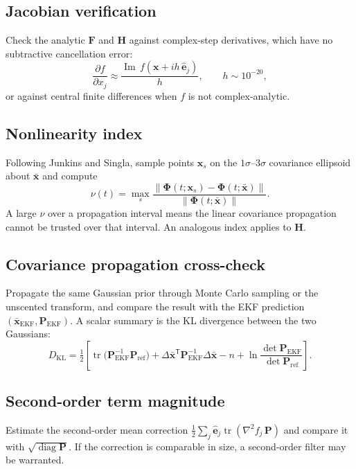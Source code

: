 \documentclass[11pt]{article}
\newcommand{\x}{\bm{x}}
\newcommand{\Pm}{\bm{P}}
\newcommand{\Hm}{\bm{H}}
\newcommand{\Fm}{\bm{F}}
\newcommand{\Phim}{\bm{\Phi}}
\newcommand{\T}{^{\mathsf{T}}}
\begin{document}
\subsection{Jacobian verification}
Check the analytic $\Fm$ and $\Hm$ against complex-step derivatives, which have no
subtractive cancellation error:
\begin{equation}
  \frac{\partial f}{\partial x_j} \approx
  \frac{\operatorname{Im}\, f(\x + i h\,\bm{\hat{e}}_j)}{h},
  \qquad h \sim 10^{-20},
\end{equation}
or against central finite differences when $f$ is not complex-analytic.

\subsection{Nonlinearity index}
Following Junkins and Singla, sample points $\x_s$ on the $1\sigma$--$3\sigma$ covariance
ellipsoid about $\bar{\x}$ and compute
\begin{equation}
  \nu(t) = \max_s
  \frac{\|\Phim(t;\x_s) - \Phim(t;\bar{\x})\|}{\|\Phim(t;\bar{\x})\|}.
\end{equation}
A large $\nu$ over a propagation interval means the linear covariance propagation cannot be
trusted over that interval. An analogous index applies to $\Hm$.

\subsection{Covariance propagation cross-check}
Propagate the same Gaussian prior through Monte Carlo sampling or the unscented
transform, and compare the result with the EKF prediction
$(\bar{\x}_{\mathrm{EKF}},\Pm_{\mathrm{EKF}})$. A scalar summary is the KL divergence
between the two Gaussians:
\begin{equation}
  D_{\mathrm{KL}} = \tfrac12\!\left[
  \operatorname{tr}\!\big(\Pm_{\mathrm{EKF}}^{-1}\Pm_{\mathrm{ref}}\big)
  + \Delta\bar{\x}\T\Pm_{\mathrm{EKF}}^{-1}\Delta\bar{\x}
  - n + \ln\frac{\det\Pm_{\mathrm{EKF}}}{\det\Pm_{\mathrm{ref}}}\right].
\end{equation}

\subsection{Second-order term magnitude}
Estimate the second-order mean correction
$\tfrac12\sum_j \bm{\hat{e}}_j \operatorname{tr}(\nabla^2 f_j\,\Pm)$ and compare it with
$\sqrt{\operatorname{diag}\Pm}$. If the correction is comparable in size, a second-order
filter may be warranted.
\end{document}
